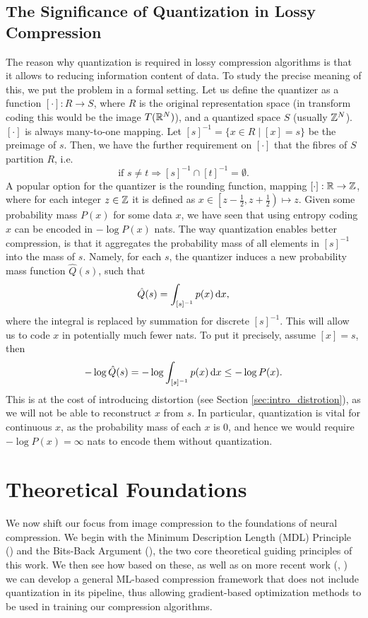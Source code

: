 \subsection{The Significance of Quantization in Lossy Compression}
\par
The reason why quantization is required in lossy compression algorithms is
that it allows to reducing information content of data. To study the
precise meaning of this, we put the problem in a formal setting.
Let us define the quantizer as a function $[\cdot]: R \rightarrow S$, where
$R$ is the original representation space (in transform coding this would be the
image $T(\mathbb{R}^N)$), and a quantized space $S$ (usually $\mathbb{Z}^N$). $[\cdot]$
is always many-to-one mapping. Let $[s]^{-1} = \{x \in R \mid [x] = s \}$ be
the preimage of $s$. Then, we have the further requirement on $[\cdot]$ 
that the fibres of $S$ partition $R$, i.e.
\[
  \text{if } s \neq t \Rightarrow [s]^{-1} \cap [t]^{-1} = \emptyset.
\]
A popular option for the quantizer is the rounding function, mapping $[\cdot]: \mathbb{R}
\rightarrow \mathbb{Z}$, where for each integer $z \in \mathbb{Z}$ it is defined as $x
\in \left[z - \frac12, z + \frac12\right) \mapsto z$. Given some probability mass $P(x)$ 
for some data $x$, we have seen that using entropy coding $x$ can be encoded in
$-\log P(x)$ nats. The way quantization enables better compression, is that it
aggregates the probability mass of all elements in $[s]^{-1}$ into the mass of $s$.
Namely, for each $s$, the quantizer induces a new probability mass function
$\hat{Q}(s)$, such that
\[
  \hat{Q}(s) = \int_{[s]^{-1}} p(x) \,\text{d} x,
\]
where the integral is replaced by summation for discrete $[s]^{-1}$. This will allow
us to code $x$ in potentially much fewer nats. To put it precisely, assume $[x] =
s$, then
\[
  -\log \hat{Q}(s) = -\log \int_{[s]^{-1}} p(x) \,\text{d} x \leq -\log P(x).
\]
This is at the cost of introducing distortion (see Section
\ref{sec:intro_distrotion}), as we will not be able to reconstruct $x$ from $s$.
In particular, quantization is vital for continuous $x$, as the probability mass
of each $x$ is 0, and hence we would require $-\log P(x) = \infty$ nats to
encode them without quantization.

\section{Theoretical Foundations}
\label{sec:intro_theoretical_foundations}
\par
We now shift our focus from image compression to the foundations of
neural compression. We begin with the Minimum Description Length (MDL)
Principle (\cite{rissanen1986stochastic}) and the Bits-Back Argument
(\cite{hinton1993keeping}), the two core theoretical guiding
principles of this work. We then see how based on these, as well as on
more recent work (\cite{harsha2007communication}, \cite{havasi2018minimal})
we can develop a general ML-based compression framework that does not include
quantization in its pipeline, thus allowing gradient-based optimization methods
to be used in training our compression algorithms.

